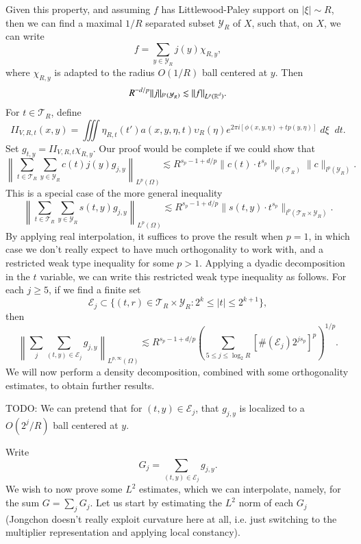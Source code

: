 Given this property, and assuming $f$ has Littlewood-Paley support on $|\xi| \sim R$, then we can find a maximal $1/R$ separated subset $\mathcal{Y}_R$ of $X$, such that, on $X$, we can write
%
\[ f = \sum_{y \in \mathcal{Y}_R} j(y) \chi_{R,y}, \]
%
where $\chi_{R,y}$ is adapted to the radius $O(1/R)$ ball centered at $y$. Then
%
\[ R^{-d/p} \| j \|_{l^p(\mathcal{Y}_R)} \lesssim \| f \|_{L^p(\operatorname{\mathbb{R}}^d)}. \]
%
For $t \in \mathcal{T}_R$, define
%
\[ II_{V,R,t}(x,y) = \iiint \eta_{R,t}(t') a(x,y,\eta,t) \upsilon_R(\eta) e^{2 \pi i [\phi(x,y,\eta) + t p(y,\eta)]}\; d\xi\;\; dt. \]
%
Set $g_{t,y} = II_{V,R,t} \chi_{R,y}$. Our proof would be complete if we could show that
%
\[ \left\| \sum_{t \in \mathcal{T}_R} \sum_{y \in \mathcal{Y}_R} c(t) j(y) g_{j,y} \right\|_{L^p(\Omega)} \lesssim R^{s_p - 1 + d/p} \| c(t) \cdot t^{s_p} \|_{l^p(\mathcal{T}_R)} \| c \|_{l^p(\mathcal{Y}_R)}. \]
%
This is a special case of the more general inequality
%
\[ \left\| \sum_{t \in \mathcal{T}_R} \sum_{y \in \mathcal{Y}_R} s(t,y) g_{j,y} \right\|_{L^p(\Omega)} \lesssim R^{s_p - 1 + d/p} \| s(t,y) \cdot t^{s_p}  \|_{l^p(\mathcal{T}_R \times \mathcal{Y}_R)}. \]
%
By applying real interpolation, it suffices to prove the result when $p = 1$, in which case we don't really expect to have much orthogonality to work with, and a restricted weak type inequality for some $p > 1$. Applying a dyadic decomposition in the $t$ variable, we can write this restricted weak type inequality as follows. For each $j \geq 5$, if we find a finite set
%
\[ \mathcal{E}_j \subset \{ (t,r) \in \mathcal{T}_R \times \mathcal{Y}_R: 2^k \leq |t| \leq 2^{k+1} \}, \]
%
then
%
\[ \left\| \sum_j \sum_{(t,y) \in \mathcal{E}_j} g_{j,y} \right\|_{L^{p,\infty}(\Omega)} \lesssim R^{s_p - 1 + d/p} \left( \sum_{5 \leq j \leq \log_2 R} [ \#(\mathcal{E}_j) 2^{js_p} ]^p \right)^{1/p}. \]
%
We will now perform a density decomposition, combined with some orthogonality estimates, to obtain further results.

TODO: We can pretend that for $(t,y) \in \mathcal{E}_j$, that $g_{j,y}$ is localized to a $O(2^j / R)$ ball centered at $y$.

Write
%
\[ G_j = \sum_{(t,y) \in \mathcal{E}_j} g_{j,y}. \]
%
We wish to now prove some $L^2$ estimates, which we can interpolate, namely, for the sum $G = \sum_j G_j$. Let us start by estimating the $L^2$ norm of each $G_j$ (Jongchon doesn't really exploit curvature here at all, i.e. just switching to the multiplier representation and applying local constancy).




